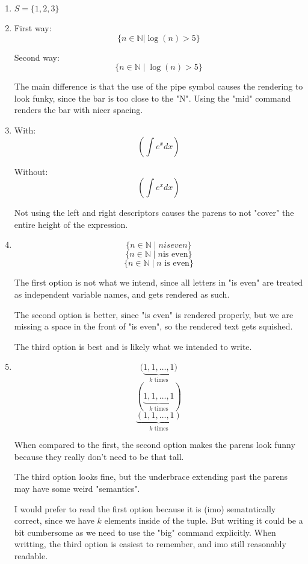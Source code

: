 \documentclass{article}
\begin{document}
\begin{enumerate}
    \item \(S = \{1, 2, 3\}\)

    \item {
        First way:
        \[\{n \in \mathbb{N} | \log(n) > 5 \} \]

        Second way:
        \[\{n \in \mathbb{N} \mid \log(n) > 5 \}\]

        The main difference is that the use of the pipe symbol causes the rendering
        to look funky, since the bar is too close to the "N". Using the "mid" command 
        renders the bar with nicer spacing.
    }

    \item {
        With:
        \[ \left( \int e^x dx \right) \]

        Without:
        \[ (\int e^x dx) \]

        Not using the left and right descriptors causes the parens to not "cover"
        the entire height of the expression.
    }

    \item {
        \[\{n \in \mathbb{N} \mid n is even \}\]
        \[\{n \in \mathbb{N} \mid n \text{is even} \}\]
        \[\{n \in \mathbb{N} \mid n \text{ is even} \}\]

        The first option is not what we intend, since all letters in "is even"
        are treated as independent variable names, and gets rendered as such. 

        The second option is better, since "is even" is rendered properly, but 
        we are missing a space in the front of "is even", so the rendered text
        gets squished. 

        The third option is best and is likely what we intended to write.
    }

    \item {
        \[\big(\underbrace{1,1,\dots,1}_{k\text{ times}}\big)\]
        \[\left(\underbrace{1,1,\dots,1}_{k\text{ times}}\right)\]
        \[\underbrace{\left(1,1,\dots,1\right)}_{k\text{ times}}\]

        When compared to the first, the second option makes the parens
        look funny because they really don't need to be that tall. 

        The third option looks fine, but the underbrace extending past 
        the parens may have some weird "semantics".

        I would prefer to read the first option because it is (imo)
        sematntically correct, since we have \(k\) elements inside of
        the tuple. But writing it could be a bit cumbersome as we need to
        use the "big" command explicitly. When writting, the third option 
        is easiest to remember, and imo still reasonably readable.
    }
\end{enumerate}
\end{document}

